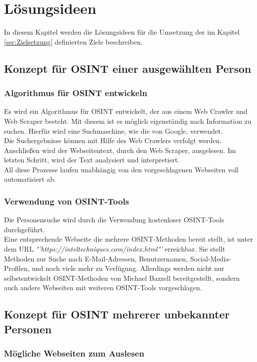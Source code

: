 
\chapter{Lösungsideen}  %
\label{cha:Lösungsideen} %
In diesem Kapitel werden die Lösungsideen für die Umsetzung der im Kapitel \ref{sec:Zielsetzung} definierten Ziele beschreiben.

\section{Konzept für OSINT einer ausgewählten Person}
	\subsection{Algorithmus für OSINT entwickeln}
	Es wird ein Algorithmus für OSINT entwickelt, der aus einem Web Crawler und Web Scraper besteht. Mit diesem ist es möglich eigenständig nach Information zu suchen. Hierfür wird eine Suchmaschine, wie die von Google, verwendet.\\
	Die Suchergebnisse können mit Hilfe des Web Crawlers verfolgt werden. Anschließen wird der Webseitentext, durch den Web Scraper, ausgelesen. Im letzten Schritt, wird der Text analysiert und interpretiert.\\
	All diese Prozesse laufen unabhängig von den vorgeschlagenen Webseiten voll automatisiert ab.
	\subsection{Verwendung von OSINT-Tools}
	Die Personensuche wird durch die Verwendung kostenloser OSINT-Tools durchgeführt.\\ 
	Eine entsprechende Webseite die mehrere OSINT-Methoden bereit stellt, ist unter dem URL \textit{"'https://inteltechniques.com/index.html"'} erreichbar. Sie stellt Methoden zur Suche nach E-Mail-Adressen, Benutzernamen, Social-Media-Profilen, und noch viele mehr zu Verfügung. Allerdings werden nicht nur selbstentwickelt OSINT-Methoden von Michael Bazzell bereitgestellt, sondern auch andere Webseiten mit weiteren OSINT-Tools vorgeschlagen.

\section{Konzept für OSINT mehrerer unbekannter Personen}
	\subsection{Mögliche Webseiten zum Auslesen}
